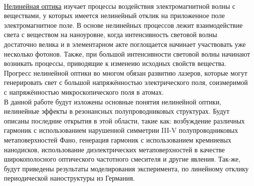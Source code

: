 \\
\hspace*{2mm}
\underline{Нелинейная оптика} изучает процессы воздействия электромагнитной волны с веществами, у которых имеется нелинейный отклик на приложенное поле электромагнитное поле. В основе нелинейных процессов лежит  взаимодействие света с веществом на наноуровне, когда интенсивность световой волны достаточно велика и в элементарном акте поглощается начинает участвовать уже несколько фотонов. Также, при большой интенсивности световой волны  начинают возникать процессы, приводящие к изменеию исходных свойств вещества. Прогресс нелинейной оптики во многом обязан развитию лазеров, которые могут генерировать свет с большой напряжённостью электрического поля, соизмеримой с напряжённостью микроскопического поля в атомах.
\\
\hspace*{2mm}
В данной работе будут изложены основные понятия нелинейной оптики, нелинейные эффекты в резонансных полупроводниковых структурах. Будут описаны последние открытия в этой области, такие как: возбуждение различных гармоник с использованием нарушенной симметрии III-V полупроводниковых метаповерхностей Фано, генерация гармоник с использованием кремниевых нанодисков, использование диэлектрических метаповерхностей в качестве широкополосного оптического частотного смесителя и другие явления. Так-же, будут приведены результаты моделирования эксперимента, по линейному отклику периодической наноструктуры из Германия.

